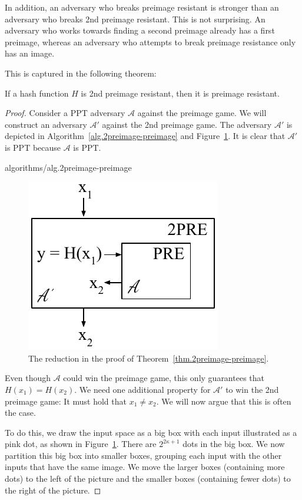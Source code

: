 In addition, an adversary who breaks preimage resistant is stronger than an adversary who breaks 2nd preimage resistant. This is not surprising. An adversary who works towards finding a second preimage already has a first preimage, whereas an adversary who attempts to break preimage resistance only has an image.

This is captured in the following theorem:

\begin{theorem}
  \label{thm.2preimage-preimage}
  If a hash function $H$ is 2nd preimage resistant, then it is preimage resistant.
\end{theorem}
\begin{proof}
  Consider a PPT adversary $\mathcal{A}$ against the preimage game.
  We will construct an adversary $\mathcal{A}'$ against the 2nd preimage game. The adversary $\mathcal{A}'$ is depicted
  in Algorithm~\ref{alg.2preimage-preimage} and Figure~\ref{fig.2preimage-preimage}. It is clear that $\mathcal{A}'$ is PPT because $\mathcal{A}$ is PPT.

  {algorithms/alg.2preimage-preimage}

  \begin{figure}[H]
    \centering
    \includegraphics[width=0.3 \columnwidth,keepaspectratio]{figures/2pre-pre.pdf}
    \caption{The reduction in the proof of Theorem~\ref{thm.2preimage-preimage}.}
    \label{fig.2preimage-preimage}
  \end{figure}

  Even though $\mathcal{A}$ could win the preimage game, this only guarantees that $H(x_1) = H(x_2)$.
  We need one additional property for $\mathcal{A}'$ to win the 2nd preimage game: It must hold that $x_1 \neq x_2$.
  We will now argue that this is often the case.

  To do this, we draw the input space as a big box with
  each input illustrated as a pink dot, as shown in Figure~\ref{fig.2preimage-preimage}. There are $2^{2\kappa + 1}$ dots in the big box. We now partition this big box into smaller boxes, grouping each input with the other inputs that have the same image. We move the larger boxes (containing more dots) to the left of the picture and the smaller boxes (containing fewer dots) to the right of the picture.


\end{proof}
